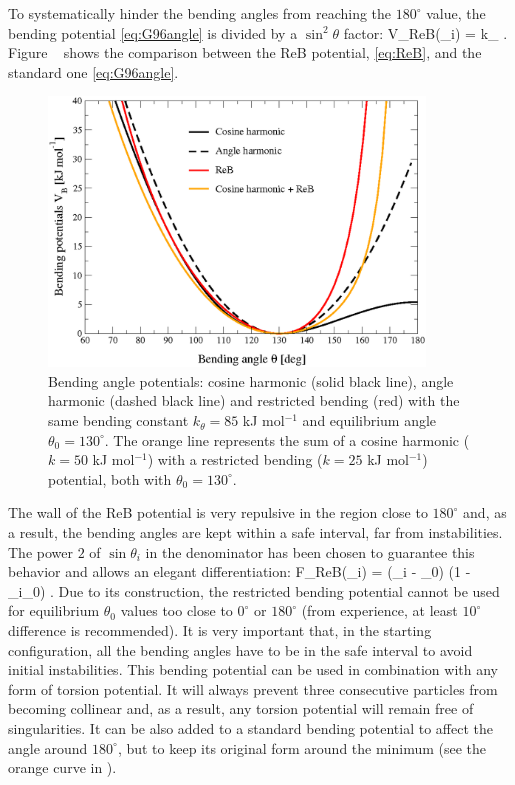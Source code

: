 To systematically hinder the bending angles from reaching the $180^{\circ}$ value,
the bending potential \ref{eq:G96angle} is divided by a $\sin^2\theta$ factor:
%
\beq
V_{\rm ReB}(\theta_i) =  k_{\theta} .
\label{eq:ReB}
\eeq
%
Figure ~ shows the comparison between the ReB potential, \ref{eq:ReB},
and the standard one \ref{eq:G96angle}.
%
\begin{figure}
\centerline{\includegraphics[width=10cm]{plots/fig-02}}
\vspace*{8pt}
\caption{Bending angle potentials: cosine harmonic (solid black line), angle harmonic
(dashed black line) and restricted bending (red) with the same bending constant
$k_{\theta}=85$ kJ mol$^{-1}$ and equilibrium angle $\theta_0=130^{\circ}$.
The orange line represents the sum of a cosine harmonic ($k =50$ kJ mol$^{-1}$)
with a restricted bending ($k =25$ kJ mol$^{-1}$) potential, both with $\theta_0=130^{\circ}$.}
\label{fig:ReB}
\end{figure}
%
The wall of the ReB potential is very repulsive in the region close to $180^{\circ}$ and,
as a result, the bending angles are kept within a safe interval, far from instabilities.
The power $2$ of $\sin\theta_i$ in the denominator has been chosen to guarantee this behavior
and allows an elegant differentiation:
%
\beq
F_{\rm ReB}(\theta_i) = (\cos\theta_i - \cos\theta_0) (1 - \cos\theta_i\cos\theta_0) .
\label{eq:diff_ReB}
\eeq
%
Due to its construction, the restricted bending potential cannot be used for equilibrium
$\theta_0$ values too close to $0^{\circ}$ or $180^{\circ}$ (from experience, at least $10^{\circ}$
difference is recommended). It is very important that, in the starting configuration,
all the bending angles have to be in the safe interval to avoid initial instabilities.
This bending potential can be used in combination with any form of torsion potential.
It will always prevent three consecutive particles from becoming collinear and,
as a result, any torsion potential will remain free of singularities.
It can be also added to a standard bending potential to affect the angle around $180^{\circ}$,
but to keep its original form around the minimum (see the orange curve in ).


